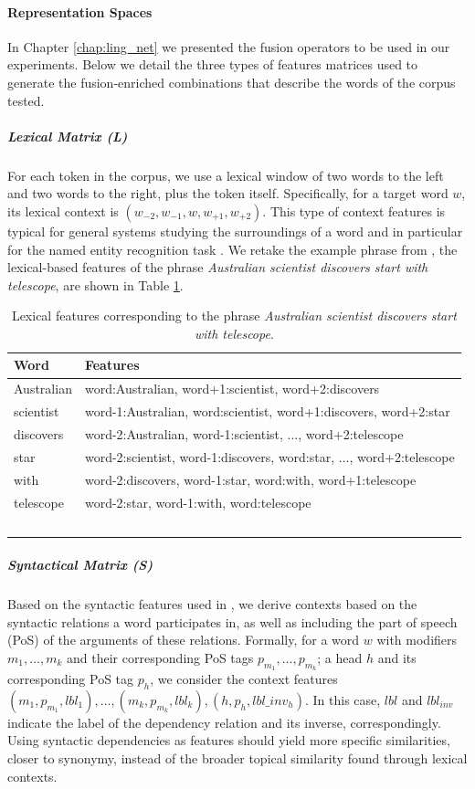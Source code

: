 \paragraph{Representation Spaces}\label{sec:rep_spaces}
In  Chapter \ref{chap:ling_net} we presented the fusion operators to be used in our experiments. Below we detail the three types of features matrices used to generate the fusion-enriched combinations that describe the words of the corpus tested.
\subparagraph{Lexical Matrix (L)}
For each token in the corpus, we use a lexical window of two words to the left and two words to the right, plus the token itself. Specifically, for a target word $w$, its lexical context is $(w_{-2}, w_{-1}, w, w_{+1}, w_{+2})$. This type of context features is typical for general systems studying the surroundings of a word and in particular for the named entity recognition task \cite{Daume2006,Nothman2009,RatinovR09}. 
 We retake the example phrase from \cite{LevyG14}, the lexical-based features of the phrase \textit{Australian scientist discovers start with telescope}, are shown in Table \ref{tab:lex-contextos}.
 
\begin{table}[ht]
\centering
\begin{tabular}{ll}
\hline 
 \textbf{Word} & \textbf{Features} \\ 
\hline 
Australian & word:Australian, word+1:scientist, word+2:discovers\\ 
scientist  &  word-1:Australian, word:scientist, word+1:discovers, word+2:star\\ 
discovers & word-2:Australian, word-1:scientist, $\dots$, word+2:telescope \\ 
star & word-2:scientist, word-1:discovers, word:star, $\dots$, word+2:telescope \\ 
with & word-2:discovers, word-1:star, word:with, word+1:telescope \\ 
telescope  &  word-2:star, word-1:with, word:telescope \\ 
\hline \
\end{tabular} 

\caption{Lexical features corresponding to the phrase \textit{Australian scientist discovers start with telescope}.}
\label{tab:lex-contextos}
\end{table} 

\subparagraph{Syntactical Matrix (S)}
Based on the syntactic features used in   \cite{LevyG14,Panchenko2017}, we derive contexts based on the syntactic relations a word participates in, as well as including the part of speech (PoS) of the arguments of these relations. Formally, for a word $w$ with modifiers $m_1, \dots, m_k$ and their corresponding PoS tags $p_{m_1}, \dots, p_{m_k}$; a head $h$ and its corresponding PoS tag $p_h$, we consider the context features $(m_1, p_{m_1}, lbl_1), \dots, \allowbreak (m_k, p_{m_k}, lbl_k), \allowbreak (h,p_h,lbl\_inv_h)$. In this case, $lbl$ and $lbl_{inv}$ indicate the label of the dependency relation and its inverse, correspondingly. Using syntactic dependencies as features should yield more specific similarities, closer to synonymy, instead of the broader topical similarity found through lexical contexts.


